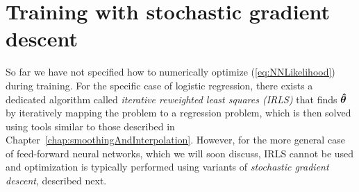 \documentclass[10pt,twoside]{book}
\begin{document}
\section{Training with stochastic gradient descent}

So far we have not specified how to 
numerically optimize (\eqref{eq:NNLikelihood}) 
during training.
For the specific case of logistic regression, there exists a dedicated algorithm called \emph{iterative reweighted least squares (IRLS)} that finds ${\mbox{\boldmath {${\hat{\theta}}$}}}$ by iteratively mapping the problem to a regression problem, which is then solved using tools similar to those described in Chapter~\ref{chap:smoothingAndInterpolation}. 
However, for the more general case of feed-forward neural networks, 
which we will soon discuss, 
IRLS cannot be used and optimization is typically performed using variants of \emph{stochastic gradient descent},
described next.
\end{document}
